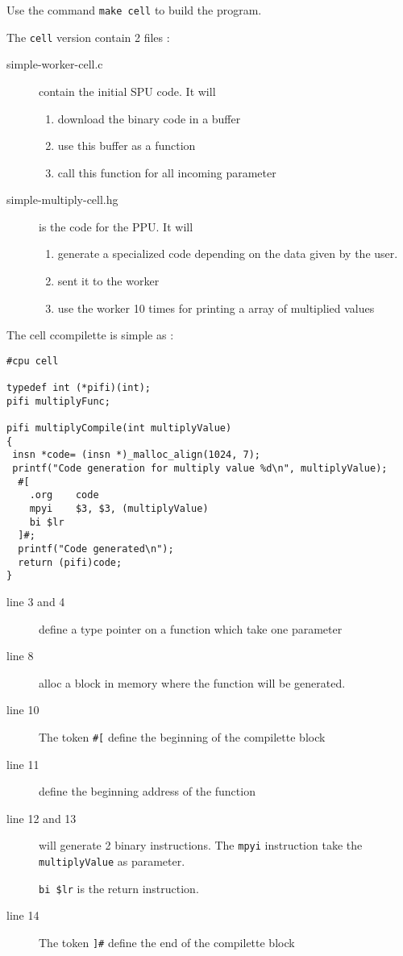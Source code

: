 \documentclass{article}
\begin{document}
Use the command \texttt{make cell} to build the program.

The \texttt{cell} version contain 2 files :
\begin{description}
\item[simple-worker-cell.c] contain the initial SPU code. It will
  \begin{enumerate}
  \item download the binary code in a buffer
  \item use this buffer as a function
  \item call this function for all incoming parameter
  \end{enumerate}
\item[simple-multiply-cell.hg] is the code for the PPU. It will
  \begin{enumerate}
  \item generate a specialized code depending on the data given by the user.
  \item sent it to the worker
  \item use the worker 10 times for printing a array of multiplied values
  \end{enumerate}
\end{description}

The cell ccompilette is simple as :

\begin{lstlisting}
#cpu cell

typedef int (*pifi)(int);
pifi multiplyFunc; 

pifi multiplyCompile(int multiplyValue)
{
 insn *code= (insn *)_malloc_align(1024, 7);
 printf("Code generation for multiply value %d\n", multiplyValue);
  #[
	.org	code
	mpyi    $3, $3, (multiplyValue) 
	bi $lr 
  ]#;
  printf("Code generated\n");
  return (pifi)code;
}
\end{lstlisting} %

\begin{description}
\item[line 3 and 4] define a type pointer on a function which take one
  parameter
\item[line 8] alloc a block in memory where the function will be generated.
\item[line 10] The token \verb|#[| define the beginning of the
  compilette block
\item[line 11] define the beginning address of the function
\item[line 12 and 13] will generate 2 binary instructions. The
  \texttt{mpyi} instruction take the \texttt{multiplyValue} as
  parameter.

  \texttt{bi \$lr} is the return instruction.

\item[line 14] The token \verb|]#| define the end of the compilette block
\end{description}
\end{document}

